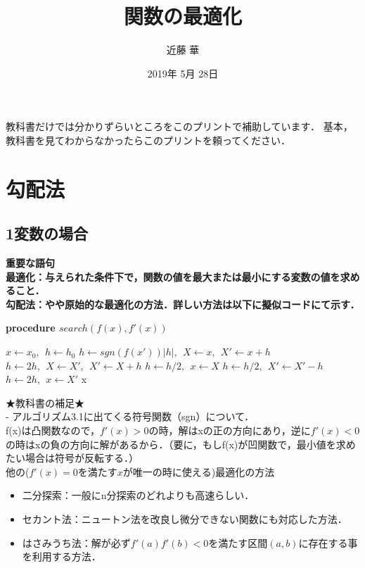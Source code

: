 \documentclass[11pt,a4paper]{jsarticle}
\title{関数の最適化}
\author{近藤 華}
\date{2019年 5月 28日}
\begin{document}
\maketitle
教科書だけでは分かりずらいところをこのプリントで補助しています．
基本，教科書を見てわからなかったらこのプリントを頼ってください．

\section{勾配法}
\subsection{1変数の場合}
\bf{重要な語句}\\
\bf{最適化}：与えられた条件下で，関数の値を最大または最小にする変数の値を求めること．\\
\bf{勾配法}：やや原始的な最適化の方法．詳しい方法は以下に擬似コードにて示す．\\

\begin{algorithm}                      
\caption{\bf{procedure} $search(f(x),f'(x))$}         
\label{alg1}                          
\begin{algorithmic}
\STATE $x \gets x_{0},\   \ h \gets h_{0}$
\STATE $h \gets sgn(f(x'))|h|,\    \ X \gets x, \    \ X' \gets x + h$
\STATE $h \gets 2h,\    \ X \gets X', \    \ X' \gets X + h$
\ENDWHILE
\STATE $h \gets h/2,\    \ x \gets X$
\ELSE
{}
\STATE $h \gets h/2,\    \ X' \gets X' - h$
\ENDWHILE
\STATE $h \gets 2h,\    \ x \gets X'$
\ENDIF
\ENDWHILE
\RETURN x
\end{algorithmic}
\end{algorithm}


★教科書の補足★\\
- アルゴリズム3.1に出てくる符号関数（sgn）について．\\
f(x)は凸関数なので，$f'(x)>0$の時，解はxの正の方向にあり，逆に$f'(x)<0$の時はxの負の方向に解があるから．（要に，もしf(x)が凹関数で，最小値を求めたい場合は符号が反転する．）\\

他の($f'(x)=0を満たすxが唯一の時に使える$)最適化の方法
\begin{itemize}
  \item 二分探索：一般にn分探索のどれよりも高速らしい．
  \item セカント法：ニュートン法を改良し微分できない関数にも対応した方法．
  \item はさみうち法：解が必ず$f'(a)f'(b)<0$を満たす区間$(a,b)$に存在する事を利用する方法．
\end{itemize}
\end{document}
